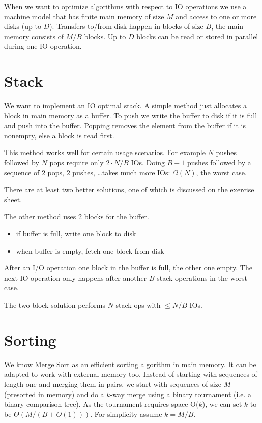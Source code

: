 When we want to optimize algorithms with respect to IO operations we use a machine model that has finite main memory of size $M$ and access to one or more disks (up to $D$). Transfers to/from disk happen in blocks of size $B$, the main memory consists of $M/B$ blocks. Up to $D$ blocks can be read or stored in parallel during one IO operation.

\section{Stack}

We want to implement an IO optimal stack. A simple method just allocates a block in main memory as a buffer. To push we write the buffer to disk if it is full and push into the buffer. Popping removes the element from the buffer if it is nonempty, else a block is read first.

This method works well for certain usage scenarios. For example $N$ pushes followed by $N$ pops require only $2 \cdot N/B$ IOs. Doing $B+1$ pushes followed by a sequence of $2$ pops, $2$ pushes, \ldots takes much more IOs: $\Omega(N)$, the worst case.

There are at least two better solutions, one of which is discussed on the exercise sheet.

The other method uses 2 blocks for the buffer.

\begin{itemize}
 \item if buffer is full, write one block to disk
 \item when buffer is empty, fetch one block from disk
\end{itemize}

After an I/O operation one block in the buffer is full, the other one empty. The next IO operation only happens after another $B$ stack operations in the worst case.

\begin{lem} The two-block solution performs $N$ stack ops with $\leq N/B$ IOs.
\end{lem}

\section{Sorting}

We know Merge Sort as an efficient sorting algorithm in main memory. It can be adapted to work with external memory too. Instead of starting with sequences of length one and merging them in pairs, we start with sequences of size $M$ (presorted in memory) and do a $k$-way merge using a binary tournament (i.e. a binary comparison tree). As the tournament requires space O($k$), we can set $k$ to be $\Theta(M/(B+O(1)))$. For simplicity assume $k=M/B$.

